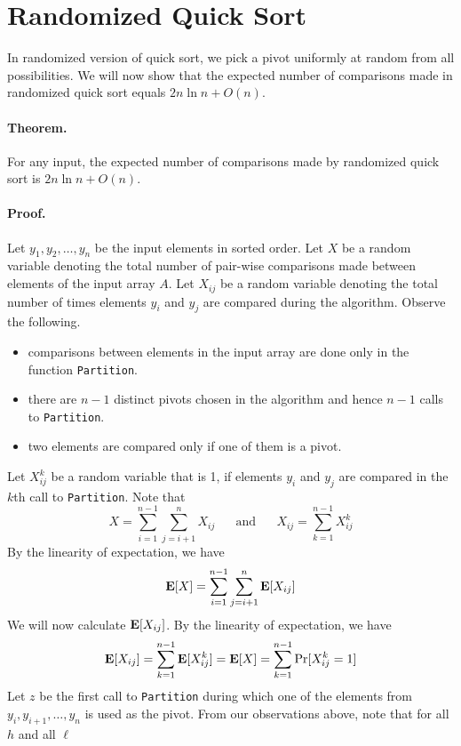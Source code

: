\documentclass[11pt,twoside]{article}
\newcommand{\E}{{\mbox {\bf E}}}
\begin{document}
\section*{Randomized Quick Sort}
In randomized version of quick sort, we pick a pivot uniformly at
random from all possibilities. We will
now show that the expected number of comparisons made in randomized
quick sort equals $2n\ln n + O(n)$.

\paragraph{Theorem.} For any input, the expected number of comparisons
made by randomized quick sort is $2n\ln n +O(n)$.

\paragraph{Proof.} Let $y_1,y_2, \ldots, y_n$ be the input elements in
sorted order. Let $X$ be a random variable denoting the total
number of pair-wise comparisons made between elements of the input
array $A$. Let $X_{ij}$ be a random variable denoting the total number
of times elements $y_i$ and $y_j$ are compared during the
algorithm. Observe the following.
\begin{itemize}
\item
comparisons between elements in the input array are done only in the
function \texttt{Partition}.
\item
there are $n-1$ distinct pivots chosen in the algorithm and hence
$n-1$ calls to \texttt{Partition}. 
\item
two elements are compared only if one of them is a pivot.
\end{itemize} 
Let $X_{ij}^{k}$ be a random variable that is 1, if elements $y_i$ and
$y_j$ are compared in the $k$th call to \texttt{Partition}. Note that 
\[
X = \sum_{i=1}^{n-1}\sum_{j=i+1}^{n}X_{ij} \mbox{~~~~~and~~~~~} X_{ij} = \sum_{k=1}^{n-1}X_{ij}^k
\]
By the linearity of expectation, we have 
\begin{equation}
\label{eqn:Ex}
\E[X] = \sum_{i=1}^{n-1}\sum_{j=i+1}^{n}\E[X_{ij}]
\end{equation}
We will now calculate $\E[X_{ij}]$. By the linearity of expectation,
we have
\[
\E[X_{ij}] = \sum_{k=1}^{n-1}\E[X_{ij}^{k}] = \E[X] = \sum_{k=1}^{n-1}\Pr[X_{ij}^{k}=1]
\]
Let $z$ be the first call to \texttt{Partition} during which one of
the elements from $y_i,y_{i+1}, \ldots, y_n$ is used as the
pivot. From our observations above, note that for all $h$ and all $\ell$
\end{document}
